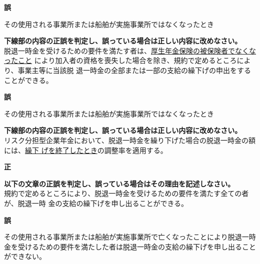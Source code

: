 \begin{answerbox}
  \textbf{誤}

  その使用される事業所または船舶が実施事業所ではなくなったとき
\end{answerbox}

\begin{truefalse}[年金1 2019 問題1(2)\textcircled{1}]
        \textbf{下線部の内容の正誤を判定し、誤っている場合は正しい内容に改めなさい。}
  \\

脱退一時金を受けるための要件を満たす者は、\underline{厚生年金保険の被保険者でなくなったこと}
により加入者の資格を喪失した場合を除き、規約で定めるところにより、事業主等に当該脱
退一時金の全部または一部の支給の繰下げの申出をすることができる。
\end{truefalse}

\begin{answerbox}
  \textbf{誤}

  その使用される事業所または船舶が実施事業所ではなくなったとき
\end{answerbox}

\begin{truefalse}[年金1 H29 問題1(5)\textcircled{5}]
        \textbf{下線部の内容の正誤を判定し、誤っている場合は正しい内容に改めなさい。}
  \\

リスク分担型企業年金において、脱退一時金を繰り下げた場合の脱退一時金の額には、\underline{繰下
げを終了したとき}の調整率を適用する。
\end{truefalse}

\begin{answerbox}
  \textbf{正}
\end{answerbox}

\begin{truefalse}[年金1 H28 問題2(1)\textcircled{2}]
\textbf{以下の文章の正誤を判定し、誤っている場合はその理由を記述しなさい。}
  \\

  規約で定めるところにより、脱退一時金を受けるための要件を満たす全ての者が、脱退一時
金の支給の繰下げを申し出ることができる。
\end{truefalse}

\begin{answerbox}
  \textbf{誤}

  その使用される事業所または船舶が実施事業所で亡くなったことにより脱退一時金を受けるための要件を満たした者は脱退一時金の支給の繰下げを申し出ることができない。
\end{answerbox}

